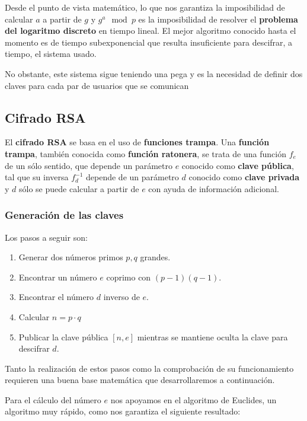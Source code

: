 \documentclass[nochap]{apuntesURJC}
\begin{document}
Desde el punto de vista matemático, lo que nos garantiza la imposibilidad de calcular $a$ a partir de $g$ y $g^a \mod p$ es la imposibilidad de resolver el \textbf{problema del logaritmo discreto} en tiempo lineal. El mejor algoritmo conocido hasta el momento es de tiempo subexponencial que resulta insuficiente para descifrar, a tiempo, el sistema usado.

No obstante, este sistema sigue teniendo una pega y es la necesidad de definir dos claves para cada par de usuarios que se comunican

\subsection{Cifrado RSA}
El \textbf{cifrado RSA} se basa en el uso de \textbf{funciones trampa}. Una \textbf{función trampa}, también conocida como \textbf{función ratonera}, se trata de una función $f_e$ de un sólo sentido, que depende un parámetro $e$ conocido como \textbf{clave pública}, tal que su inversa $f_d^{-1}$ depende de un parámetro $d$ conocido como \textbf{clave privada} y $d$ sólo se puede calcular a partir de $e$ con ayuda de información adicional.

\subsubsection{Generación de las claves}
Los pasos a seguir son:
\begin{enumerate}
\item Generar dos números primos $p,q$ grandes.

\item Encontrar un número $e$ coprimo con $(p-1)(q-1)$.

\item Encontrar el número $d$ inverso de $e$.

\item Calcular $n=p\cdot q$

\item Publicar la clave pública $[n,e]$ mientras se mantiene oculta la clave para descifrar $d$.
\end{enumerate}

Tanto la realización de estos pasos como la comprobación de su funcionamiento requieren una buena base matemática que desarrollaremos a continuación.

Para el cálculo del número $e$ nos apoyamos en el algoritmo de Euclides, un algoritmo muy rápido, como nos garantiza el siguiente resultado:
\end{document}
